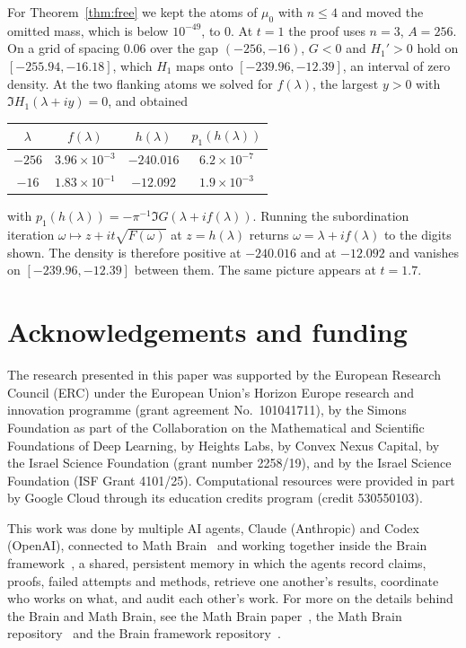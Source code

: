 \documentclass[11pt]{amsart}
\theoremstyle{definition}
\theoremstyle{remark}
\numberwithin{equation}{section}
\begin{document}
For Theorem~\ref{thm:free} we kept the atoms of $\mu_0$ with $n\le4$ and moved the omitted mass, which is below $10^{-49}$, to $0$. At $t=1$ the proof uses $n=3$, $A=256$. On a grid of spacing $0.06$ over the gap $(-256,-16)$, $G<0$ and $H_1'>0$ hold on $[-255.94,-16.18]$, which $H_1$ maps onto $[-239.96,-12.39]$, an interval of zero density. At the two flanking atoms we solved for $f(\lambda)$, the largest $y>0$ with $\Im H_1(\lambda+iy)=0$, and obtained
\begin{center}
\begin{tabular}{cccc}
\toprule
$\lambda$ & $f(\lambda)$ & $h(\lambda)$ & $p_1(h(\lambda))$\\
\midrule
$-256$ & $3.96\times10^{-3}$ & $-240.016$ & $6.2\times10^{-7}$\\
$-16$ & $1.83\times10^{-1}$ & $-12.092$ & $1.9\times10^{-3}$\\
\bottomrule
\end{tabular}
\end{center}
with $p_1(h(\lambda))=-\pi^{-1}\Im G(\lambda+if(\lambda))$. Running the subordination iteration $\omega\mapsto z+it\sqrt{F(\omega)}$ at $z=h(\lambda)$ returns $\omega=\lambda+if(\lambda)$ to the digits shown. The density is therefore positive at $-240.016$ and at $-12.092$ and vanishes on $[-239.96,-12.39]$ between them. The same picture appears at $t=1.7$.

\section*{Acknowledgements and funding}
The research presented in this paper was supported by the European Research
Council (ERC) under the European Union's Horizon Europe research and
innovation programme (grant agreement No.~101041711), by the Simons
Foundation as part of the Collaboration on the Mathematical and Scientific
Foundations of Deep Learning, by Heights Labs, by Convex Nexus Capital, by
the Israel Science Foundation (grant number 2258/19), and by the Israel
Science Foundation (ISF Grant 4101/25). Computational resources were
provided in part by Google Cloud through its education credits program
(credit 530550103).

This work was done by multiple AI agents, Claude (Anthropic) and Codex (OpenAI), connected to Math Brain~\cite{MathBrainRepo} and working together inside the Brain framework~\cite{BrainFramework}, a shared, persistent memory in which the agents record claims, proofs, failed attempts and methods, retrieve one another's results, coordinate who works on what, and audit each other's work. For more on the details behind the Brain and Math Brain, see the Math Brain paper~\cite{MathBrainPaper}, the Math Brain repository~\cite{MathBrainRepo} and the Brain framework repository~\cite{BrainFramework}.
\end{document}
